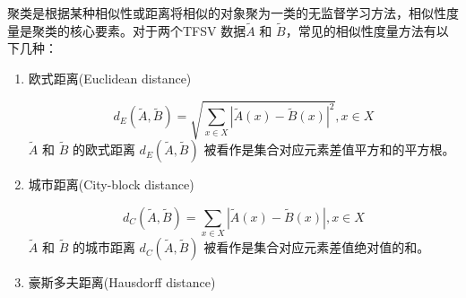 聚类是根据某种相似性或距离将相似的对象聚为一类的无监督学习方法，相似性度量是聚类的核心要素。对于两个TFSV 数据$\tilde{A}$ 和 $\tilde{B}$，常见的相似性度量方法有以下几种：
\begin{enumerate}[(1)]
    \item 欧式距离(Euclidean distance)

          \begin{equation}
              \label{equ:eucliden}
              d_E(\tilde{A}, \tilde{B}) = \sqrt{\sum_{x \in X} |\tilde{A}(x)-\tilde{B}(x)|^2 }, x \in X
          \end{equation}
          $\tilde{A}$ 和 $\tilde{B}$ 的欧式距离 $d_E(\tilde{A}, \tilde{B})$ 被看作是集合对应元素差值平方和的平方根。
    \item 城市距离(City-block distance)

          \begin{equation}
              \label{equ:cityblock}
              d_C(\tilde{A}, \tilde{B}) = \sum_{x \in X}|\tilde{A}(x)-\tilde{B}(x)| , x \in X
          \end{equation}
          $\tilde{A}$ 和 $\tilde{B}$ 的城市距离 $d_C(\tilde{A}, \tilde{B})$ 被看作是集合对应元素差值绝对值的和。

    \item 豪斯多夫距离(Hausdorff distance)


\end{enumerate}

